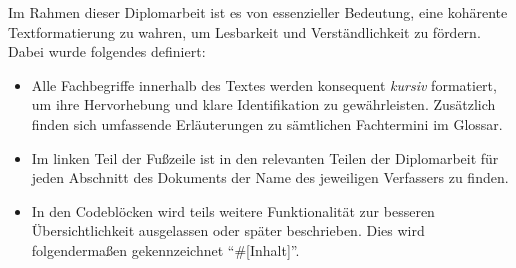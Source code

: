 Im Rahmen dieser Diplomarbeit ist es von essenzieller Bedeutung, eine kohärente Textformatierung zu wahren, um Lesbarkeit und Verständlichkeit zu fördern. Dabei wurde folgendes definiert:
\begin{itemize}
    \item Alle Fachbegriffe innerhalb des Textes werden konsequent \textit{kursiv} formatiert, um ihre Hervorhebung und klare Identifikation zu gewährleisten. Zusätzlich finden sich umfassende Erläuterungen zu sämtlichen Fachtermini im Glossar.

    \item Im linken Teil der Fußzeile ist in den relevanten Teilen der Diplomarbeit für jeden Abschnitt des Dokuments der Name des jeweiligen Verfassers zu finden.  
    
    \item In den Codeblöcken wird teils weitere Funktionalität zur besseren Übersichtlichkeit ausgelassen oder später beschrieben. Dies wird folgendermaßen gekennzeichnet \enquote{\#[Inhalt]}.
\end{itemize}




